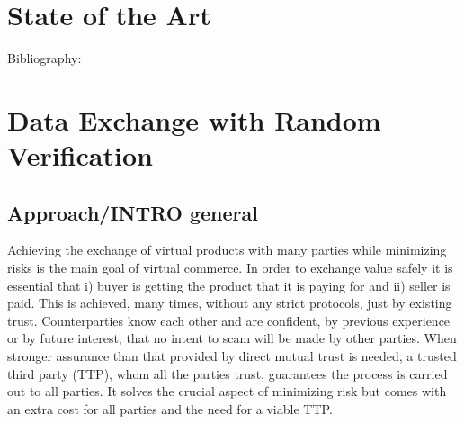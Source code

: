 \documentclass[]{article}
\begin{document}
\section{State of the Art}
\cite{ALABI201723}

Bibliography:



\section{Data Exchange with Random Verification}

\subsection{Approach/INTRO general}
Achieving the exchange of virtual products with many parties while minimizing risks is the main goal of virtual commerce. In order to exchange value safely it is essential that i) buyer is getting the product that it is paying for and ii) seller is paid. This is achieved, many times, without any strict protocols, just by existing trust. Counterparties know each other and are confident, by previous experience or by future interest, that no intent to scam will be made by other parties. When stronger assurance than that provided by direct mutual trust is needed, a trusted third party (TTP), whom all the parties trust, guarantees the process is carried out to all parties. It solves the crucial aspect of minimizing risk but comes with an extra cost for all parties and the need for a viable TTP.
\end{document}
